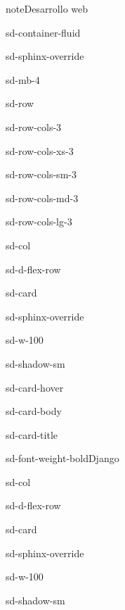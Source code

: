 \documentclass[letterpaper,10pt,spanish]{sphinxmanual}
\begin{document}
\begin{sphinxadmonition}{note}{Desarrollo web}
\begin{sphinxuseclass}{sd-container-fluid}
\begin{sphinxuseclass}{sd-sphinx-override}
\begin{sphinxuseclass}{sd-mb-4}
\begin{sphinxuseclass}{sd-row}
\begin{sphinxuseclass}{sd-row-cols-3}
\begin{sphinxuseclass}{sd-row-cols-xs-3}
\begin{sphinxuseclass}{sd-row-cols-sm-3}
\begin{sphinxuseclass}{sd-row-cols-md-3}
\begin{sphinxuseclass}{sd-row-cols-lg-3}
\begin{sphinxuseclass}{sd-col}
\begin{sphinxuseclass}{sd-d-flex-row}
\begin{sphinxuseclass}{sd-card}
\begin{sphinxuseclass}{sd-sphinx-override}
\begin{sphinxuseclass}{sd-w-100}
\begin{sphinxuseclass}{sd-shadow-sm}
\begin{sphinxuseclass}{sd-card-hover}
\begin{sphinxuseclass}{sd-card-body}
\begin{sphinxuseclass}{sd-card-title}
\begin{sphinxuseclass}{sd-font-weight-bold}Django
\end{sphinxuseclass}
\end{sphinxuseclass}
\end{sphinxuseclass}
\noindent{}
\end{sphinxuseclass}
\end{sphinxuseclass}
\end{sphinxuseclass}
\end{sphinxuseclass}
\end{sphinxuseclass}
\end{sphinxuseclass}
\end{sphinxuseclass}
\begin{sphinxuseclass}{sd-col}
\begin{sphinxuseclass}{sd-d-flex-row}
\begin{sphinxuseclass}{sd-card}
\begin{sphinxuseclass}{sd-sphinx-override}
\begin{sphinxuseclass}{sd-w-100}
\begin{sphinxuseclass}{sd-shadow-sm}

\end{sphinxuseclass}
\end{sphinxuseclass}
\end{sphinxuseclass}
\end{sphinxuseclass}
\end{sphinxuseclass}
\end{sphinxuseclass}
\end{sphinxuseclass}
\end{sphinxuseclass}
\end{sphinxuseclass}
\end{sphinxuseclass}
\end{sphinxuseclass}
\end{sphinxuseclass}
\end{sphinxuseclass}
\end{sphinxuseclass}
\end{sphinxuseclass}
\end{sphinxadmonition}
\end{document}
